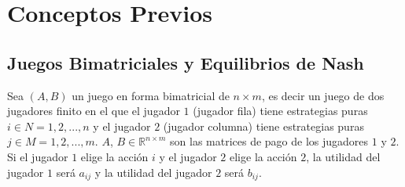 \newcommand{\concept}{\textbf}

\chapter{Conceptos Previos}  \label{cap:previos}

\section{Juegos Bimatriciales y Equilibrios de Nash}



Sea $(A, B)$ un juego en forma bimatricial de $n \times m$, es decir un juego de dos jugadores finito en el que el jugador $1$ (jugador fila) tiene estrategias puras $i \in N = {1, 2, ..., n}$ y el jugador $2$ (jugador columna) tiene estrategias puras $j \in M = {1, 2, ..., m}$. $A$, $B \in \mathbb{R}^{n \times m}$ son las matrices de pago de los jugadores $1$ y $2$. Si el jugador $1$ elige la acción $i$ y el jugador $2$ elige la acción $2$, la utilidad del jugador $1$ será $a_{ij}$ y la utilidad del jugador $2$ será $b_{ij}$.

